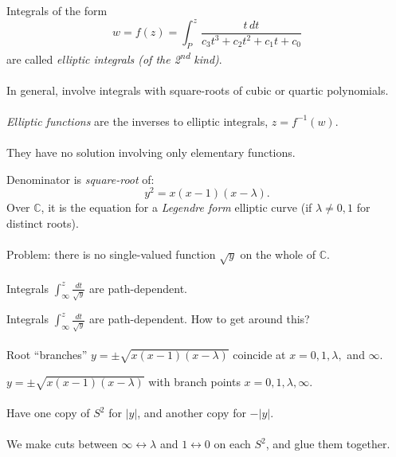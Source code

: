 \documentclass{beamer}
\begin{document}
\begin{frame}
	Integrals of the form
	\begin{equation*}
		w = f(z) = \int_{P}^{z} \frac{t\, dt}{c_{3}t^{3} + c_{2}t^{2} + c_{1}t + c_{0}}
	\end{equation*}
	are called \emph{elliptic integrals (of the 2\textsuperscript{nd} kind)}. \\~\\
	
	In general, involve integrals with square-roots of cubic or quartic polynomials. \\~\\
	
	\emph{Elliptic functions} are the inverses to elliptic integrals, $z = f^{-1}(w)$. \\~\\
		
	They have no solution involving only elementary functions.
\end{frame}

\begin{frame}
	Denominator is \emph{square-root} of:
	\begin{equation*}
		y^{2} = x(x-1)(x-\lambda).
	\end{equation*}
	Over $\mathbb{C}$, it is the equation for a \emph{Legendre form} elliptic curve (if $\lambda \neq 0,1$ for distinct roots). \\~\\
	
	Problem: there is no single-valued function $\sqrt{y}$ on the whole of $\mathbb{C}$. \\~\\
	
	Integrals $\int_{\infty}^{z}\tfrac{dt}{\sqrt{y}}$ are path-dependent.
\end{frame}

\begin{frame}
	Integrals $\int_{\infty}^{z}\tfrac{dt}{\sqrt{y}}$ are path-dependent. How to get around this? \\~\\
	
	Root ``branches'' $y = \pm \sqrt{x(x-1)(x-\lambda)}$ coincide at $x = 0,1,\lambda,$ and $\infty$.	
\end{frame}

\begin{frame}
	$y = \pm \sqrt{x(x-1)(x-\lambda)}$ with branch points $x = 0,1,\lambda,\infty$. \\~\\
	
	Have one copy of $S^{2}$ for $|y|$, and another copy for $-|y|$. \\~\\
	
	We make cuts between $\infty \longleftrightarrow \lambda$ and $1 \longleftrightarrow 0$ on each $S^{2}$, and glue them together.
	
\end{frame}

\begin{frame}
\end{frame}

\begin{frame}
\end{frame}

\begin{frame}
\end{frame}

\begin{frame}
\end{frame}
\end{document}
